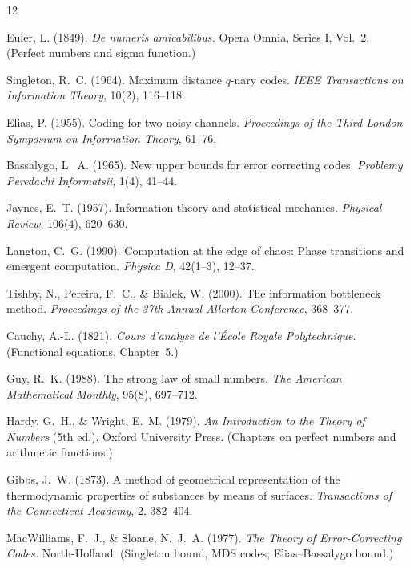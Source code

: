\documentclass[11pt,a4paper]{article}
\begin{document}
\begin{thebibliography}{12}

Euler, L. (1849).
\emph{De numeris amicabilibus.}
Opera Omnia, Series I, Vol.\ 2.
(Perfect numbers and sigma function.)

Singleton, R.~C. (1964).
Maximum distance $q$-nary codes.
\emph{IEEE Transactions on Information Theory}, 10(2), 116--118.

Elias, P. (1955).
Coding for two noisy channels.
\emph{Proceedings of the Third London Symposium on Information Theory}, 61--76.

Bassalygo, L.~A. (1965).
New upper bounds for error correcting codes.
\emph{Problemy Peredachi Informatsii}, 1(4), 41--44.

Jaynes, E.~T. (1957).
Information theory and statistical mechanics.
\emph{Physical Review}, 106(4), 620--630.

Langton, C.~G. (1990).
Computation at the edge of chaos: Phase transitions and emergent computation.
\emph{Physica D}, 42(1--3), 12--37.

Tishby, N., Pereira, F.~C., \& Bialek, W. (2000).
The information bottleneck method.
\emph{Proceedings of the 37th Annual Allerton Conference}, 368--377.

Cauchy, A.-L. (1821).
\emph{Cours d'analyse de l'\'Ecole Royale Polytechnique.}
(Functional equations, Chapter~5.)

Guy, R.~K. (1988).
The strong law of small numbers.
\emph{The American Mathematical Monthly}, 95(8), 697--712.

Hardy, G.~H., \& Wright, E.~M. (1979).
\emph{An Introduction to the Theory of Numbers} (5th ed.).
Oxford University Press.
(Chapters on perfect numbers and arithmetic functions.)

Gibbs, J.~W. (1873).
A method of geometrical representation of the thermodynamic properties of substances by means of surfaces.
\emph{Transactions of the Connecticut Academy}, 2, 382--404.

MacWilliams, F.~J., \& Sloane, N.~J.~A. (1977).
\emph{The Theory of Error-Correcting Codes.}
North-Holland.
(Singleton bound, MDS codes, Elias--Bassalygo bound.)

\end{thebibliography}
\end{document}
